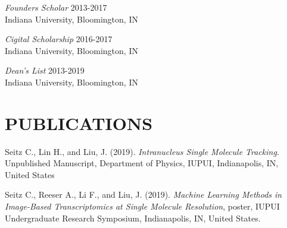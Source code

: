 \documentclass[margin, 10pt]{res} %
\begin{document}
\begin{resume}
{\sl Founders Scholar} \hfill 2013-2017 \\
Indiana University, Bloomington, IN 

{\sl Cigital Scholarship} \hfill 2016-2017 \\
Indiana University, Bloomington, IN 

{\sl Dean’s List} \hfill 2013-2019 \\
Indiana University, Bloomington, IN 

\section{PUBLICATIONS}

Seitz C., Lin H., and Liu, J. (2019). \textit{Intranucleus Single Molecule Tracking}. Unpublished Manuscript, Department of Physics, IUPUI, Indianapolis, IN, United States	

Seitz C., Reeser A., Li F., and Liu, J. (2019). \textit{Machine Learning Methods in Image-Based Transcriptomics at Single Molecule Resolution}, poster, IUPUI Undergraduate Research Symposium, Indianapolis, IN, United States.

\end{resume}
\end{document}
